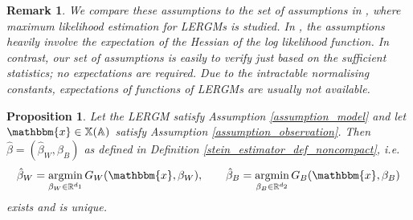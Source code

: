 \documentclass{article}
\newtheorem{Proposition}[Theorem]{Proposition}
\newtheorem{Remark}[Theorem]{Remark}
\DeclareMathOperator*{\argmin}{argmin}
\begin{document}
\begin{Remark}
    We compare these assumptions to the set of assumptions in \cite{stewart2026rates}, where maximum likelihood estimation for LERGMs is studied. In \cite{stewart2026rates}, the assumptions heavily involve the expectation of the Hessian of the log likelihood function.
    In contrast, our set of assumptions is easily to verify just based on the sufficient statistics; no expectations are required. Due to the intractable normalising constants, expectations of functions of LERGMs are usually not available. 
\end{Remark}

\begin{Proposition} \label{prop_estimators_uniqueness_existence}
    Let the LERGM satisfy Assumption \ref{assumption_model} and let $\mathbbm{x} \in \mathbb{X}(\mathbb{A})$ satisfy Assumption \ref{assumption_observation}. Then $\hat{\beta} = (\hat{\beta}_W, \hat{\beta}_B)$ as defined in Definition \ref{stein_estimator_def_noncompact}, i.e. 
    \begin{align*}
        \hat{\beta}_W = \argmin_{\beta_W \in \mathbb{R}^{d_1}} G_W(\mathbbm{x},\beta_W), \qquad \hat{\beta}_B = \argmin_{\beta_B \in \mathbb{R}^{d_2}} G_B(\mathbbm{x},\beta_B)
    \end{align*}
    exists and is unique. 
\end{Proposition} 
\end{document}
